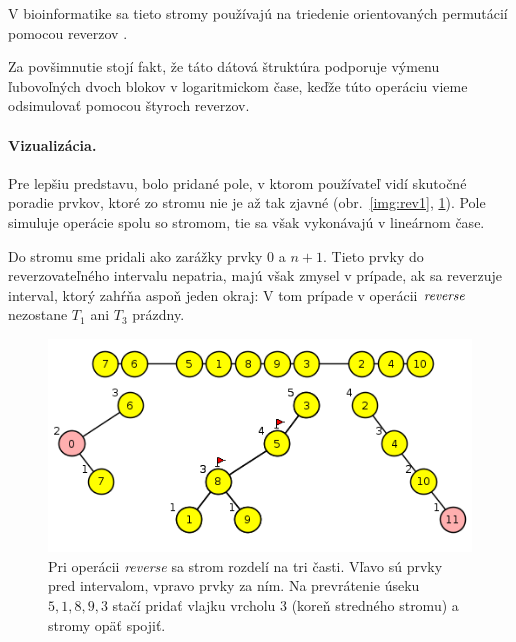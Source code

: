 V bioinformatike sa tieto stromy používajú na triedenie orientovaných permutácií
pomocou reverzov \citep{reversals,reversals2}.

Za povšimnutie stojí fakt, že táto dátová štruktúra podporuje výmenu ľubovoľných dvoch blokov
v logaritmickom čase, keďže túto operáciu vieme odsimulovať pomocou štyroch reverzov.

\paragraph{Vizualizácia.}
Pre lepšiu predstavu, bolo pridané pole, v ktorom používateľ vidí skutočné poradie prvkov, ktoré
zo stromu nie je až tak zjavné (obr.~\ref{img:rev1}, \ref{img:rev2}). Pole simuluje operácie spolu so stromom,
tie sa však vykonávajú v lineárnom čase.

Do stromu sme pridali ako zarážky prvky 0 a $n+1$. Tieto prvky do reverzovateľného
intervalu nepatria, majú však zmysel v prípade, ak sa reverzuje interval, ktorý zahŕňa
aspoň jeden okraj: V tom prípade v operácii $\mathop{\mathit{reverse}}$ nezostane $T_1$ ani $T_3$ prázdny. 

\begin{figure}
\includegraphics[width=\columnwidth]{obrazky/rev2.png}
\caption{Pri operácii \emph{reverse} sa strom rozdelí na tri časti. 
Vľavo sú prvky pred intervalom, vpravo prvky za ním. 
Na prevrátenie úseku $5,1,8,9,3$ stačí pridať vlajku vrcholu 3 (koreň stredného stromu)
a stromy opäť spojiť.}
\label{img:rev2}
\end{figure}

